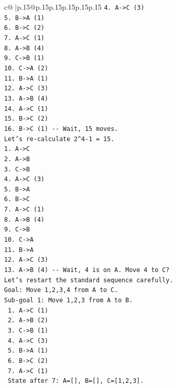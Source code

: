 \documentclass{article}
\begin{document}
{\begin{supertabular}{c@{$\;$}|p{.15\linewidth}@{}p{.15\linewidth}p{.15\linewidth}p{.15\linewidth}p{.15\linewidth}p{.15\linewidth}}
{{{\texttt{4. A{-}>C (3)} \\
\texttt{5. B{-}>A (1)} \\
\texttt{6. B{-}>C (2)} \\
\texttt{7. A{-}>C (1)} \\
\texttt{8. A{-}>B (4)} \\
\texttt{9. C{-}>B (1)} \\
\texttt{10. C{-}>A (2)} \\
\texttt{11. B{-}>A (1)} \\
\texttt{12. A{-}>C (3)} \\
\texttt{13. A{-}>B (4)} \\
\texttt{14. A{-}>C (1)} \\
\texttt{15. B{-}>C (2)} \\
\texttt{16. B{-}>C (1) {-}{-} Wait, 15 moves.} \\
\texttt{Let's re{-}calculate 2\^{}4{-}1 = 15.} \\
\texttt{1. A{-}>C} \\
\texttt{2. A{-}>B} \\
\texttt{3. C{-}>B} \\
\texttt{4. A{-}>C (3)} \\
\texttt{5. B{-}>A} \\
\texttt{6. B{-}>C} \\
\texttt{7. A{-}>C (1)} \\
\texttt{8. A{-}>B (4)} \\
\texttt{9. C{-}>B} \\
\texttt{10. C{-}>A} \\
\texttt{11. B{-}>A} \\
\texttt{12. A{-}>C (3)} \\
\texttt{13. A{-}>B (4) {-}{-} Wait, 4 is on A. Move 4 to C?} \\
\texttt{Let's restart the standard sequence carefully.} \\
\texttt{Goal: Move 1,2,3,4 from A to C.} \\
\texttt{Sub{-}goal 1: Move 1,2,3 from A to B.} \\
\texttt{  1. A{-}>C (1)} \\
\texttt{  2. A{-}>B (2)} \\
\texttt{  3. C{-}>B (1)} \\
\texttt{  4. A{-}>C (3)} \\
\texttt{  5. B{-}>A (1)} \\
\texttt{  6. B{-}>C (2)} \\
\texttt{  7. A{-}>C (1)} \\
\texttt{  State after 7: A={[}{]}, B={[}{]}, C={[}1,2,3{]}.} \\
}}}
\end{supertabular}}
\end{document}
